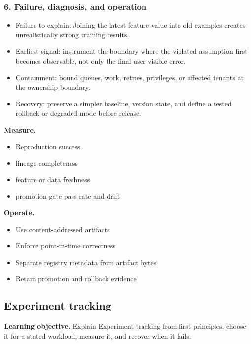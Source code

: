 \subsubsection*{6. Failure, diagnosis, and operation}
\begin{itemize}
\item Failure to explain: Joining the latest feature value into old examples creates unrealistically strong training results.
\item Earliest signal: instrument the boundary where the violated assumption first becomes observable, not only the final user-visible error.
\item Containment: bound queues, work, retries, privileges, or affected tenants at the ownership boundary.
\item Recovery: preserve a simpler baseline, version state, and define a tested rollback or degraded mode before release.
\end{itemize}
\textbf{Measure.}\begin{itemize}
\item Reproduction success
\item lineage completeness
\item feature or data freshness
\item promotion-gate pass rate and drift
\end{itemize}
\textbf{Operate.}\begin{itemize}
\item Use content-addressed artifacts
\item Enforce point-in-time correctness
\item Separate registry metadata from artifact bytes
\item Retain promotion and rollback evidence
\end{itemize}
\subsection{Experiment tracking}
\textbf{Learning objective.} Explain Experiment tracking from first principles, choose it for a stated workload, measure it, and recover when it fails.
